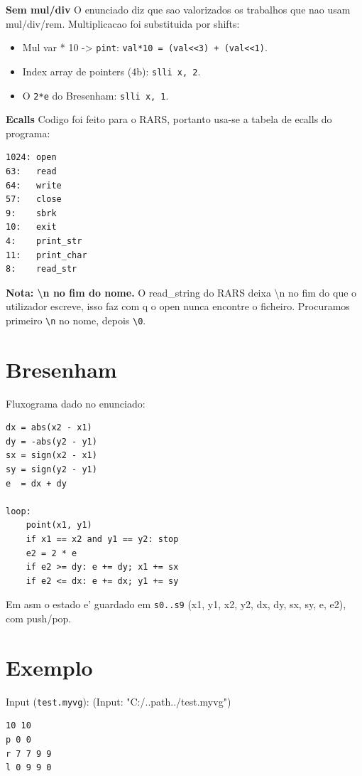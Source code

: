 \documentclass[11pt,a4paper]{article}
\begin{document}
\textbf{Sem mul/div} 
O enunciado diz que sao valorizados os trabalhos que nao usam mul/div/rem. Multiplicacao foi substituida por shifts:
\begin{itemize}
\item Mul var * 10 -> \texttt{pint}: \texttt{val*10 = (val<<3) + (val<<1)}.
\item Index array de pointers (4b): \texttt{slli x, 2}.
\item O \texttt{2*e} do Bresenham: \texttt{slli x, 1}.
\end{itemize}





\textbf{Ecalls} 
Codigo foi feito para o RARS, portanto usa-se a tabela de ecalls do programa:
\begin{verbatim}
1024: open
63:   read
64:   write
57:   close
9:    sbrk
10:   exit
4:    print_str
11:   print_char
8:    read_str
\end{verbatim}


\textbf{Nota: \textbackslash{}n no fim do nome.} 
O read\_string do RARS deixa \textbackslash{}n no fim do que o utilizador escreve,
isso faz com q o open nunca encontre o ficheiro.
Procuramos primeiro \texttt{\textbackslash{}n} no nome, depois \texttt{\textbackslash{}0}.

\section{Bresenham}

Fluxograma dado no enunciado:
\begin{verbatim}
dx = abs(x2 - x1)
dy = -abs(y2 - y1)
sx = sign(x2 - x1)
sy = sign(y2 - y1)
e  = dx + dy

loop:
    point(x1, y1)
    if x1 == x2 and y1 == y2: stop
    e2 = 2 * e
    if e2 >= dy: e += dy; x1 += sx
    if e2 <= dx: e += dx; y1 += sy
\end{verbatim}



Em asm o estado e' guardado em \texttt{s0..s9} 
(x1, y1, x2, y2, dx, dy, sx, sy, e, e2), 
com push/pop.





\section{Exemplo}

Input (\texttt{test.myvg}):
(Input: "C:/..path../test.myvg")
\begin{verbatim}
10 10
p 0 0
r 7 7 9 9
l 0 9 9 0
\end{verbatim}
\end{document}

